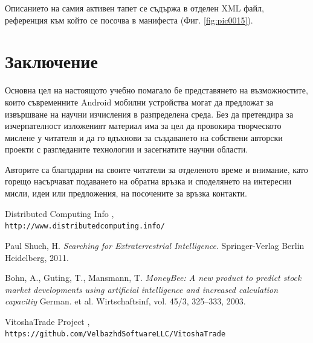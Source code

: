 \documentclass[book,14pt,oneside,openany]{memoir}
\begin{document}
Описанието на самия активен тапет се съдържа в отделен XML файл, референция към който се посочва в манифеста (Фиг. \ref{fig:pic0015}).

\newpage
{}
\chapter*{Заключение}

Основна цел на настоящото учебно помагало бе представянето на възможностите, които съвременните Android мобилни устройства могат да предложат за извършване на научни изчисления в разпределена среда. Без да претендира за изчерпателност изложеният материал има за цел да провокира творческото мислене у читателя и да го вдъхнови за създаването на собствени авторски проекти с разгледаните технологии и засегнатите научни области.  

Авторите са благодарни на своите читатели за отделеното време и внимание, като горещо насърчават подаването на обратна връзка и споделянето на интересни мисли, идеи или предложения, на посочените за връзка контакти.

\newpage
\begin{thebibliography}{99}

 Distributed Computing Info , \\\texttt{http://www.distributedcomputing.info/}

 Paul Shuch, H. \textit{Searching for Extraterrestrial Intelligence}. Springer-Verlag Berlin Heidelberg, 2011.

 Bohn, A., Guting, T., Mansmann, T. \textit{MoneyBee: A new product to predict stock market developments using artificial intelligence and increased calculation capacitiy} German. et al. Wirtschaftsinf, vol. 45/3, 325--333, 2003.

 VitoshaTrade Project , \\\texttt{https://github.com/VelbazhdSoftwareLLC/VitoshaTrade}

\end{thebibliography}

\newpage
\printindex
\end{document}

